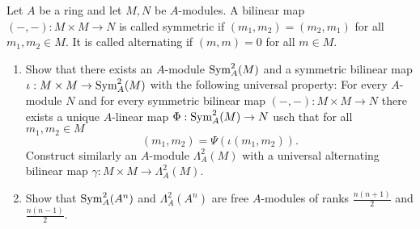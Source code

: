 \documentclass[a4paper,11pt]{article}
\begin{document}
Let $A$ be a ring and let $M,N$ be $A$-modules. A bilinear map 
$(-,-): M \times M \to N$ is called symmetric if $(m_1, m_2) = (m_2, m_1)$ for all
$m_1, m_2 \in M$. It is called alternating if $(m,m) = 0$ for all $m \in M$. 
\begin{enumerate}
    \item Show that there exists an $A$-module $\operatorname{Sym}^2_A(M)$ and a symmetric bilinear
        map $\iota: M \times M \to \operatorname{Sym}^2_A(M)$ with the following universal
        property: For every $A$-module $N$ and for every symmetric bilinear map
        $(-,-): M \times M \to N$ there exists a unique $A$-linear map $\Phi:
        \operatorname{Sym}^2_A(M) \to N$ usch that for all $m_1, m_2 \in M$
        \begin{equation*}
            (m_1, m_2) = \Psi(\iota(m_1, m_2)).
        \end{equation*}
        Construct similarly an $A$-module $\Lambda^2_A(M)$ with a universal
        alternating bilinear map $\gamma: M \times M \to \Lambda^2_A(M)$. 

    \item Show that $\operatorname{Sym}^2_A(A^n)$ and $\Lambda^2_A(A^n)$ are free $A$-modules
        of ranks $\frac{n(n+1)}2$ and $\frac{n(n-1)}2$. 
\end{enumerate}
\end{document}
